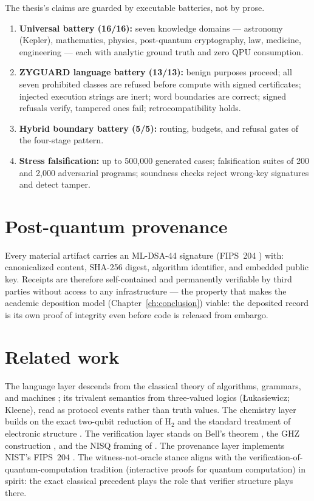 \documentclass[11pt,a4paper]{report}
\begin{document}
The thesis's claims are guarded by executable batteries, not by prose.
\begin{enumerate}
  \item \textbf{Universal battery (16/16):} seven knowledge domains ---
        astronomy (Kepler), mathematics, physics, post-quantum
        cryptography, law, medicine, engineering --- each with analytic
        ground truth and zero QPU consumption.
  \item \textbf{ZYGUARD language battery (13/13):} benign purposes
        proceed; all seven prohibited classes are refused before compute
        with signed certificates; injected execution strings are inert;
        word boundaries are correct; signed refusals verify, tampered
        ones fail; retrocompatibility holds.
  \item \textbf{Hybrid boundary battery (5/5):} routing, budgets, and
        refusal gates of the four-stage pattern.
  \item \textbf{Stress falsification:} up to 500{,}000 generated cases;
        falsification suites of 200 and 2{,}000 adversarial programs;
        soundness checks reject wrong-key signatures and detect tamper.
\end{enumerate}

\chapter{Post-quantum provenance}
\label{ch:pq}

Every material artifact carries an ML-DSA-44 signature (FIPS~204
\citep{fips204}) with: canonicalized content, SHA-256 digest, algorithm
identifier, and embedded public key. Receipts are therefore
self-contained and permanently verifiable by third parties without access
to any infrastructure --- the property that makes the academic deposition
model (Chapter~\ref{ch:conclusion}) viable: the deposited record is its
own proof of integrity even before code is released from embargo.

\chapter{Related work}
\label{ch:related}

The language layer descends from the classical theory of algorithms,
grammars, and machines \citep{knuth1997, chomsky1959, turing1936}; its
trivalent semantics from three-valued logics ({\L}ukasiewicz; Kleene),
read as protocol events rather than truth values. The chemistry layer
builds on the exact two-qubit reduction of H$_2$ \citep{omalley2016} and
the standard treatment of electronic structure \citep{nielsen2010,
feynman1982}. The verification layer stands on Bell's theorem
\citep{bell1964}, the GHZ construction \citep{ghz1990}, and the
NISQ framing of \citet{preskill2018}. The provenance layer implements
NIST's FIPS~204 \citep{fips204}. The witness-not-oracle stance aligns
with the verification-of-quantum-computation tradition (interactive
proofs for quantum computation) in spirit: the exact classical precedent
plays the role that verifier structure plays there.
\end{document}

